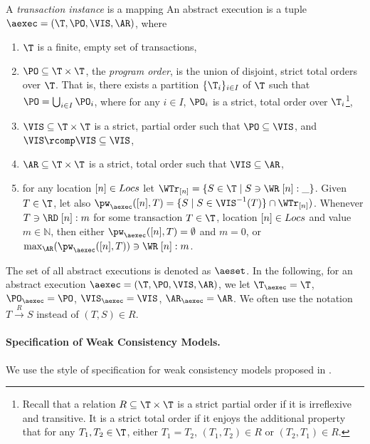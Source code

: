 \documentclass[a4paper,UKenglish]{article}%
\theoremstyle{plain}
\begin{document}
\begin{definition}
A \emph{transaction instance} is a mapping
An abstract execution is a tuple $\aexec = (\T, \PO, \VIS, \AR)$, where 

\begin{enumerate}
\item $\T$ is a finite, empty set of transactions, 
\item $\PO \subseteq \T \times \T$, the \emph{program order}, is the union 
of disjoint, strict total orders over $\T$. That is, there exists a partition $\{\T_i\}_{i \in I}$ 
of $\T$ such that $\PO = \bigcup_{i \in I} \PO_i$, where for any $i \in I$, $\PO_i$ is a strict, 
total order over $\T_i$\footnote{Recall that a relation $R \subseteq \T \times \T$ is a strict partial order 
if it is irreflexive and transitive. It is a strict total order if it enjoys the additional property that 
for any $T_1, T_2 \in \T$, either $T_1 = T_2$, $(T_1, T_2) \in R$ or $(T_2, T_1) \in R$.},
\item $\VIS \subseteq \T \times \T$ is a strict, partial order such that $\PO \subseteq \VIS$, and $\VIS \rcomp \VIS \subseteq 
\VIS$,
\item $\AR \subseteq \T \times \T$ is a strict, total order such that $\VIS \subseteq \AR$,
\item for any location $[n] \in Locs$ let $\WTr_{[n]} = \{S \in \T \mid S \ni \WR\;[n]:\_\}$. 
Given $T \in \T$, let also $\pw_{\aexec}([n], T) = \{S \mid S \in \VIS^{-1}(T)\} \cap \WTr_{[n]})$. 
Whenever $T \ni \RD\;[n]: m$ for some transaction $T \in \T$, location $[n] \in Locs$ and 
value $m \in \mathbb{N}$, then either $\pw_{\aexec}([n], T) = \emptyset$ and $m = 0$, 
or $\max_{\AR}(\pw_{\aexec}([n], T)) \ni \WR\;[n]: m$.
\end{enumerate}

\end{definition}
The set of all abstract executions is denoted as $\aeset$.
In the following, for an abstract execution $\aexec = (\T, \PO, \VIS, \AR)$, we let 
$\T_{\aexec} = \T$, $\PO_{\aexec} = \PO$, $\VIS_{\aexec} = \VIS$, $\AR_{\aexec} = \AR$. 
We often use the notation $T \xrightarrow{R} S$ instead of $(T,S) \in R$.

\paragraph{\textbf{Specification of Weak Consistency Models.}}
We use the style of specification for weak consistency models 
proposed in \cite{laws}. 
\end{document}

